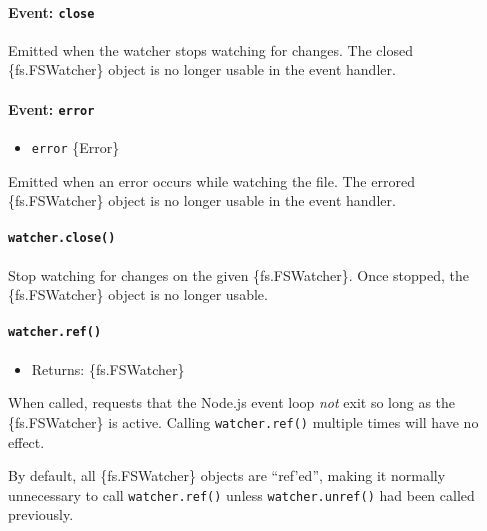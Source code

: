 \paragraph{\texorpdfstring{Event:
\texttt{\textquotesingle{}close\textquotesingle{}}}{Event: \textquotesingle close\textquotesingle{}}}\label{event-close-1}

Emitted when the watcher stops watching for changes. The closed
\{fs.FSWatcher\} object is no longer usable in the event handler.

\paragraph{\texorpdfstring{Event:
\texttt{\textquotesingle{}error\textquotesingle{}}}{Event: \textquotesingle error\textquotesingle{}}}\label{event-error}

\begin{itemize}
\tightlist
\item
  \texttt{error} \{Error\}
\end{itemize}

Emitted when an error occurs while watching the file. The errored
\{fs.FSWatcher\} object is no longer usable in the event handler.

\paragraph{\texorpdfstring{\texttt{watcher.close()}}{watcher.close()}}\label{watcher.close}

Stop watching for changes on the given \{fs.FSWatcher\}. Once stopped,
the \{fs.FSWatcher\} object is no longer usable.

\paragraph{\texorpdfstring{\texttt{watcher.ref()}}{watcher.ref()}}\label{watcher.ref}

\begin{itemize}
\tightlist
\item
  Returns: \{fs.FSWatcher\}
\end{itemize}

When called, requests that the Node.js event loop \emph{not} exit so
long as the \{fs.FSWatcher\} is active. Calling \texttt{watcher.ref()}
multiple times will have no effect.

By default, all \{fs.FSWatcher\} objects are ``ref'ed'', making it
normally unnecessary to call \texttt{watcher.ref()} unless
\texttt{watcher.unref()} had been called previously.

